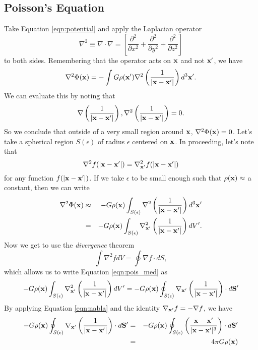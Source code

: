 \documentclass[]{article}
\begin{document}
\subsection{Poisson's Equation}

Take Equation \ref{eqn:potential} and apply the Laplacian operator 
\begin{equation}
\nabla^{2} \equiv \nabla \cdot \nabla = \left[\frac{\partial^{2}}{\partial x^{2}}+\frac{\partial^{2}}{\partial y^{2}}+\frac{\partial^{2}}{\partial z^{2}}\right]
\end{equation}
\noindent
to both sides.  Remembering that the operator acts on $\mathbf{x}$ and not $\mathbf{x}'$, we have
\begin{equation}
\label{eqn:pois_init}
\nabla^{2} \Phi(\mathbf{x}) = - \int G \rho(\mathbf{x}') \nabla^{2} \left(\frac{1}{|\mathbf{x}-\mathbf{x}'|}\right)d^{3}\mathbf{x}'.
\end{equation}
\noindent
We can evaluate this by noting that
\begin{equation}
\label{eqn:nabla}
\nabla\left(\frac{1}{|\mathbf{x} - \mathbf{x}'|}\right), \nabla^{2}\left(\frac{1}{|\mathbf{x} - \mathbf{x}'|}\right) = 0.
\end{equation}
\noindent
So we conclude that outside of a very small region around $\mathbf{x}$, $\nabla^{2}\Phi(\mathbf{x})=0$.
Let's take a spherical region $S(\epsilon)$ of radius $\epsilon$ centered on $\mathbf{x}$. In proceeding, let's 
note that 
\begin{equation}
\nabla^{2} f(|\mathbf{x}-\mathbf{x}'|) = \nabla_{\mathbf{x}'}^{2} f(|\mathbf{x}-\mathbf{x}'|)
\end{equation}
\noindent
for any function $f(|\mathbf{x} - \mathbf{x}'|)$. If we take $\epsilon$ to be small enough such 
that $\rho(\mathbf{x})\approx$ a constant, then we can write
\begin{eqnarray}
\label{eqn:pois_med}
\nabla^{2}\Phi(\mathbf{x}) &\approx& - G\rho(\mathbf{x}) \int_{S(\epsilon)} \nabla^2 \left( \frac{1}{|\mathbf{x} - \mathbf{x}'|} \right)d^{3}\mathbf{x}' \nonumber \\
&=& - G \rho(\mathbf{x})  \int_{S(\epsilon)} \nabla_{\mathbf{x}'}^2 \left( \frac{1}{|\mathbf{x} - \mathbf{x}'|} \right)d V'.
\end{eqnarray}
\noindent
Now we get to use the {\it divergence} theorem
\begin{equation}
\int \nabla^{2} f dV = \oint \nabla f \cdot dS,
\end{equation}
\noindent
which allows us to write Equation \ref{eqn:pois_med} as
\begin{equation}
- G \rho(\mathbf{x})  \int_{S(\epsilon)} \nabla_{\mathbf{x}'}^2 \left( \frac{1}{|\mathbf{x} - \mathbf{x}'|} \right)d V' = - G \rho(\mathbf{x}) \oint_{S(\epsilon)} \nabla_{\mathbf{x}'}\left(\frac{1}{|\mathbf{x}-\mathbf{x}'|}\right) \cdot d\mathbf{S}'
\end{equation}
\noindent
By applying Equation \ref{eqn:nabla} and the identity $\nabla_{\mathbf{x}'} f = -\nabla f$, we have
\begin{eqnarray}
- G \rho(\mathbf{x}) \oint_{S(\epsilon)} \nabla_{\mathbf{x}'}\left(\frac{1}{|\mathbf{x}-\mathbf{x}'|}\right) \cdot d\mathbf{S}' &=&
-G \rho(\mathbf{x}) \oint_{S(\epsilon)} \left(\frac{\mathbf{x}-\mathbf{x}'}{|\mathbf{x}-\mathbf{x}'|^{3}}\right) \cdot d\mathbf{S}' \nonumber \\
&=& 4 \pi G \rho(\mathbf{x})
\end{eqnarray}
\end{document}
